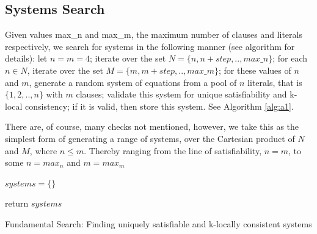 \subsection[Systems Search]{Systems Search}
Given values max\_n	and max\_m, the maximum number of clauses and literals respectively, we search for systems in the following manner (see algorithm for details): let $n=m=4$; iterate over the set $N=\{n, n+step,..,max\_n\}$; for each $n \in N$, iterate over the set $M=\{m, m+step,..,max\_m\}$; for these values of $n$ and $m$, generate a random system of equations from a pool of $n$ literals, that is $\{1,2,..,n\}$ with $m$ clauses; validate this system for unique satisfiability and k-local consistency; if it is valid, then store this system. See Algorithm \ref{alg:a1}.
\par
There are, of course, many checks not mentioned, however, we take this as the simplest form of generating a range of systems, over the Cartesian product of $N$ and $M$, where $n \leq m$. Thereby ranging from the line of satisfiability, $n=m$, to some $n=max_n$ and $m=max_m$

\begin{algorithm}[htbp!]
\SetAlgoNoLine
{}
$systems = \{\}$\;


return $systems$
\caption{Fundamental Search: Finding uniquely satisfiable and k-locally consistent systems}
\label{alg:a1}
\end{algorithm}

\newpage
